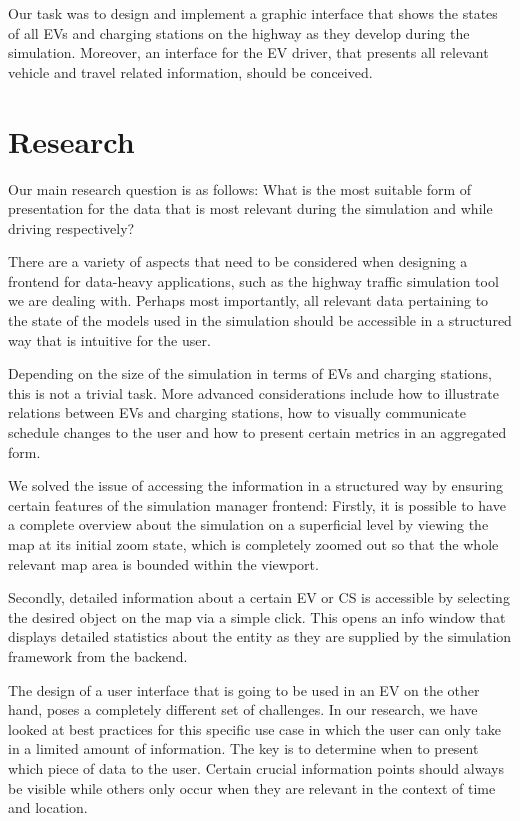 Our task was to design and implement a graphic interface that shows the states of all EVs and charging stations on
the highway as they develop during the simulation. Moreover, an interface for the EV driver, that presents all
relevant vehicle and travel related information, should be conceived.


\section{Research}

Our main research question is as follows: What is the most suitable form of presentation for the data that is most
relevant during the simulation and while driving respectively?

There are a variety of aspects that need to be considered when designing a frontend for data-heavy applications,
such as the highway traffic simulation tool we are dealing with. Perhaps most importantly, all relevant data
pertaining to the state of the models used in the simulation should be accessible in a structured way that is intuitive
for the user.

Depending on the size of the simulation in terms of EVs and charging stations, this is not a trivial
task. More advanced considerations include how to illustrate relations between EVs and charging stations, how to
visually communicate schedule changes to the user and how to present certain metrics in an aggregated form.

We solved the issue of accessing the information in a structured way by ensuring certain features of the simulation manager frontend: Firstly, it is possible to have a complete overview about the simulation on a superficial level by viewing the map at its initial zoom state, which is completely zoomed out so that the whole relevant map area is bounded within the viewport.

Secondly, detailed information about a certain EV or CS is accessible by selecting the desired object on the map via a simple click. This opens an info window that displays detailed statistics about the entity as they are supplied by the simulation framework from the backend.

The design of a user interface that is going to be used in an EV on the other hand, poses a completely different set
of challenges. In our research, we have looked at best practices for this specific use case in which the user
can only take in a limited amount of information. The key is to determine when to present which piece of
data to the user. Certain crucial information points should always be visible while others only occur
when they are relevant in the context of time and location.

